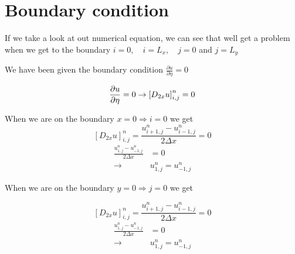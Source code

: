 \section{Boundary condition}

If we take a look at out numerical equation, we can see that well get a problem when we get to the boundary $i = 0,\quad i = L_x, \quad j = 0$ and $j = L_y$

We have been given the boundary condition $\frac{\partial u}{\partial \eta} = 0$

\begin{equation}
  \frac{\partial u}{\partial \eta} = 0 \\
  \rightarrow \left[ D_{2x}u \right]_{i,j}^{n} = 0
\end{equation}

When we are on the boundary $x = 0 \Rightarrow i = 0$ we get
\begin{equation}
 \left[ D_{2x}u \right]_{i,j}^{n} = \frac{u_{i+1,j}^n - u_{i-1,j}^n }{2 \Delta x} = 0
\end{equation}
\begin{align*}
  \frac{u_{1,j}^n - u_{-1,j}^n }{2 \Delta x} &= 0 \\
  \rightarrow& u_{1,j}^n = u_{-1,j}^n 
\end{align*}

When we are on the boundary $y = 0 \Rightarrow j = 0$ we get

\begin{equation}
 \left[ D_{2x}u \right]_{i,j}^{n} = \frac{u_{i+1,j}^n - u_{i-1,j}^n }{2 \Delta x} = 0
\end{equation}
\begin{align*}
  \frac{u_{1,j}^n - u_{-1,j}^n }{2 \Delta x} &= 0 \\
  \rightarrow& u_{1,j}^n = u_{-1,j}^n 
\end{align*}

